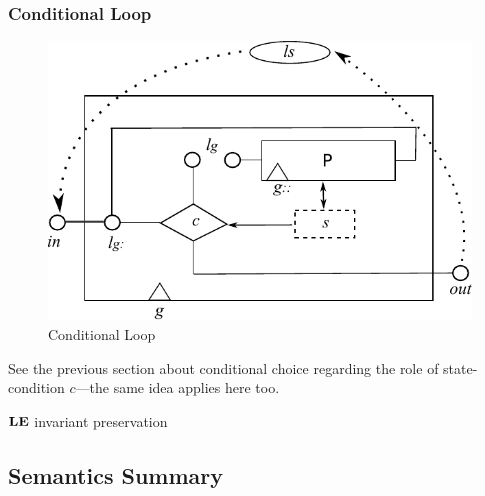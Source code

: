 \newpage
\subsubsection{Conditional Loop}

\begin{figure}[h]
  \centering
  \includegraphics{images/iteration-actual}
  \caption{Conditional Loop}
  \label{fig:cond-loop}
\end{figure}

See the previous section about conditional choice regarding the
role of state-condition $c$---the same idea applies here too.


$\mathbf{LE}$ invariant preservation

\subsection{Semantics Summary}\label{ssec:sem-recap}


